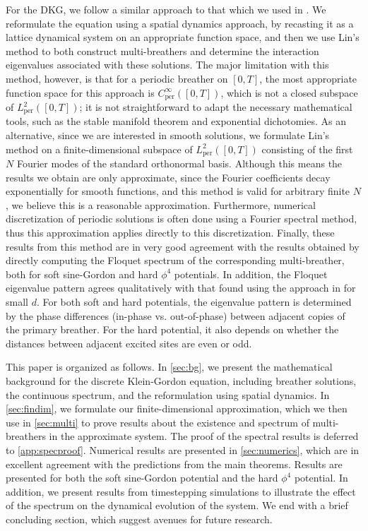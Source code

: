 \documentclass[12pt,reqno]{amsart}
\def\per{\textrm{per}}
\theoremstyle{definition}
\begin{document}
For the DKG, we follow a similar approach to that which we used in \cite{Parker2020}. We reformulate the equation using a spatial dynamics approach, by recasting it as a lattice dynamical system on an appropriate function space, and then we use Lin's method to both construct multi-breathers and determine the interaction eigenvalues associated with these solutions. The major limitation with this method, however, is that for a periodic breather on $[0,T]$, the most appropriate function space for this approach is $C^\infty_\per([0,T])$, which is not a closed subspace of $L^2_\per([0,T])$; it is not straightforward to adapt the necessary mathematical tools, such as the stable manifold theorem and exponential dichotomies. As an alternative, since we are interested in smooth solutions, we formulate Lin's method on a finite-dimensional subspace of $L^2_\per([0,T])$ consisting of the first $N$ Fourier modes of the standard orthonormal basis. Although this means the results we obtain are only approximate, since the Fourier coefficients decay exponentially for smooth functions, and this method is valid for arbitrary finite $N$, we believe this is a reasonable approximation. Furthermore, numerical discretization of periodic solutions is often done using a Fourier spectral method, thus this approximation applies directly to this discretization. Finally, these results from this method are in very good agreement with the results obtained by directly computing the Floquet spectrum of the corresponding multi-breather, both for soft sine-Gordon and hard $\phi^4$ potentials. In addition, the Floquet eigenvalue pattern agrees qualitatively with that found using the approach in \cites{Pelinovsky2012,cuevas-maraver2016} for small $d$. For both soft and hard potentials, the eigenvalue pattern is determined by the phase differences (in-phase vs. out-of-phase) between adjacent copies of the primary breather. For the hard potential, it also depends on whether the distances between adjacent excited sites are even or odd.

This paper is organized as follows. In \cref{sec:bg}, we present the mathematical background for the discrete Klein-Gordon equation, including breather solutions, the continuous spectrum, and the reformulation using spatial dynamics. In \cref{sec:findim}, we formulate our finite-dimensional approximation, which we then use in \cref{sec:multi} to prove results about the existence and spectrum of multi-breathers in the approximate system. The proof of the spectral results is deferred to \cref{app:specproof}. Numerical results are presented in \cref{sec:numerics}, which are in excellent agreement with the predictions from the main theorems. Results are presented for both the soft sine-Gordon potential and the hard $\phi^4$ potential. In addition, we present results from timestepping simulations to illustrate the effect of the spectrum on the dynamical evolution of the system. We end with a brief concluding section, which suggest avenues for future research.
\end{document}
